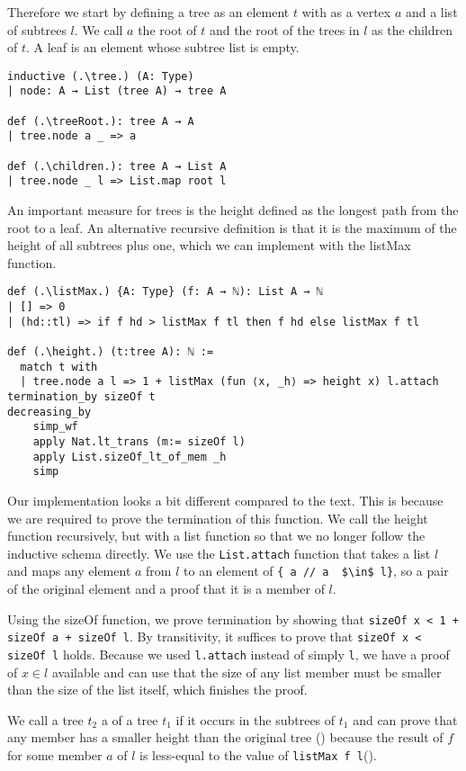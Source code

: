 Therefore we start by defining a tree as an element $t$ with as a vertex $a$ and a list of subtrees $l$. We call $a$ the root of $t$ and the root of the trees in $l$ as the children of $t$. A leaf is an element whose subtree list is empty.

\begin{lstlisting}
inductive (.\tree.) (A: Type)
| node: A → List (tree A) → tree A

def (.\treeRoot.): tree A → A
| tree.node a _ => a

def (.\children.): tree A → List A
| tree.node _ l => List.map root l
\end{lstlisting}

An important measure for trees is the height defined as the longest path from the root to a leaf.  An alternative recursive definition is that it is the maximum of the height of all subtrees plus one, which we can implement with the listMax function.

\begin{lstlisting}
def (.\listMax.) {A: Type} (f: A → ℕ): List A → ℕ
| [] => 0
| (hd::tl) => if f hd > listMax f tl then f hd else listMax f tl

def (.\height.) (t:tree A): ℕ :=
  match t with
  | tree.node a l => 1 + listMax (fun ⟨x, _h⟩ => height x) l.attach
termination_by sizeOf t
decreasing_by
    simp_wf
    apply Nat.lt_trans (m:= sizeOf l)
    apply List.sizeOf_lt_of_mem _h
    simp
\end{lstlisting}

Our implementation looks a bit different compared to the text. This is because we are required to prove the termination of this function. We call the height function recursively, but with a list function so that we no longer follow the inductive schema directly. We use the \lstinline|List.attach| function that takes a list $l$ and maps any element $a$ from $l$ to an element of \lstinline|{ a // a  $\in$ l}|, so a pair of the original element and a proof that it is a member of $l$.

Using the sizeOf function, we prove termination by showing that \lstinline|sizeOf x < 1 + sizeOf a + sizeOf l|. By transitivity, it suffices to prove that \lstinline|sizeOf x < sizeOf l| holds. Because we used \lstinline|l.attach| instead of simply \lstinline|l|, we have a proof of $x \in l$ available and can use that the size of any list member must be smaller than the size of the list itself, which finishes the proof. 

We call a tree $t_2$ a \member of a tree $t_1$ if it occurs in the subtrees of $t_1$ and can prove that any member has a smaller height than the original tree (\heightOfMemberIsSmaller) because the result of $f$ for some member $a$ of $l$ is less-equal to the value of \lstinline|listMax f l|(\listMaxlefmember).

